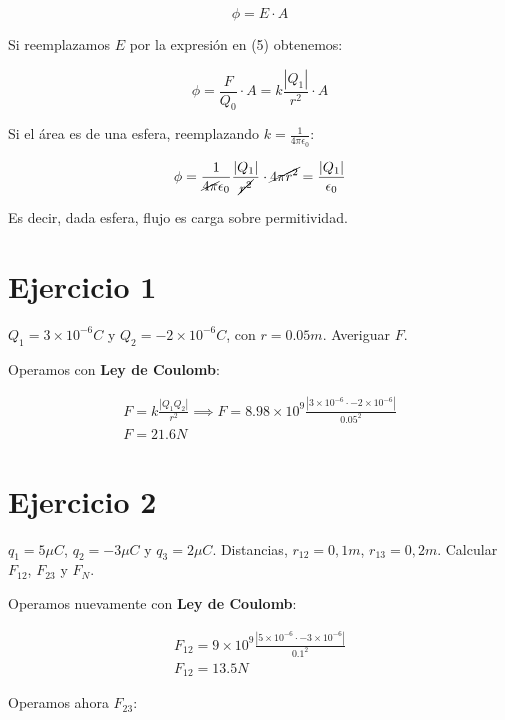 \begin{equation}
    \phi = E\cdot A
\end{equation}

Si reemplazamos \(E\) por la expresión en (5) obtenemos:

\begin{equation}
    \phi = \frac{F}{Q_0} \cdot A = k\frac{|Q_1|}{r^{2}} \cdot A
\end{equation}

Si el área es de una esfera, reemplazando \(k = \frac{1}{4\pi\epsilon_0}\):

\begin{equation}
    \phi = \frac{1}{\cancel{4\pi}\epsilon_0} \frac{|Q_1|}{\cancel{r^{2}}} \cdot \cancel{4\pi r^{2}} = \frac{|Q_1|}{\epsilon_0}
\end{equation}

Es decir, dada esfera, flujo es carga sobre permitividad.

\section{Ejercicio 1}

\(Q_1 = 3 \times 10^{-6} C\) y \(Q_2 = -2 \times 10^{-6} C\),
con \(r = 0.05m\). Averiguar \(F\).

Operamos con \textbf{Ley de Coulomb}:

\begin{align*}
    F = k\frac{|Q_1Q_2|}{r^{2}} \implies F = 8.98 \times 10^{9} \frac{|3 \times 10^{-6} \cdot -2 \times 10^{-6}|}{0.05^{2}} \\
    \boxed{F = 21.6 N}
\end{align*}

\section{Ejercicio 2}

\(q_1 = 5 \mu C\), \(q_2 = -3 \mu C\) y \(q_3 = 2 \mu C\).
Distancias, \(r_{12} = 0,1m\), \(r_{13} = 0,2m\).
Calcular \(F_{12}\), \(F_{23}\) y \(F_{N}\).

Operamos nuevamente con \textbf{Ley de Coulomb}:

\begin{align*}
    F_{12} = 9 \times 10^{9} \frac{|5 \times 10^{-6} \cdot -3 \times 10^{-6}|}{0.1^{2}} \\
    \boxed{F_{12} = 13.5 N}
\end{align*}

Operamos ahora \(F_{23}\):

